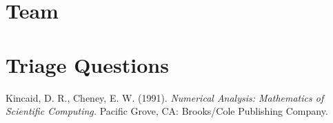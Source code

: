 \documentclass[letterpaper,notitlepage]{article}
\begin{document}
\section{Team}
\begin{comment}

\end{comment}


\section{Triage Questions}
\begin{comment}

\end{comment}



\newpage
\begin{thebibliography}{9}
Kincaid, D. R., Cheney, E. W. (1991). \textit{Numerical Analysis: Mathematics of Scientific Computing.} Pacific Grove, CA: Brooks/Cole Publishing Company.

\end{thebibliography}
\end{document}
